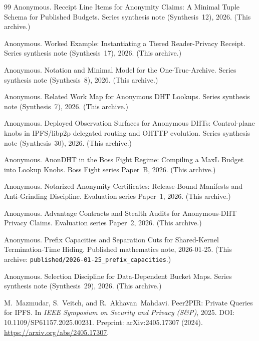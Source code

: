 \documentclass[11pt]{article}
\begin{document}
\begin{thebibliography}{99}
Anonymous.
\newblock Receipt Line Items for Anonymity Claims: A Minimal Tuple Schema for Published Budgets.
\newblock Series synthesis note (Synthesis~12), 2026. (This archive.)

Anonymous.
\newblock Worked Example: Instantiating a Tiered Reader-Privacy Receipt.
\newblock Series synthesis note (Synthesis~17), 2026. (This archive.)

Anonymous.
\newblock Notation and Minimal Model for the One-True-Archive.
\newblock Series synthesis note (Synthesis~8), 2026. (This archive.)

Anonymous.
\newblock Related Work Map for Anonymous {DHT} Lookups.
\newblock Series synthesis note (Synthesis~7), 2026. (This archive.)

Anonymous.
\newblock Deployed Observation Surfaces for Anonymous DHTs: Control-plane knobs in IPFS/libp2p delegated routing and OHTTP evolution.
\newblock Series synthesis note (Synthesis~30), 2026. (This archive.)


Anonymous.
\newblock AnonDHT in the Boss Fight Regime: Compiling a MaxL Budget into Lookup Knobs.
\newblock Boss Fight series Paper~B, 2026. (This archive.)

Anonymous.
\newblock Notarized Anonymity Certificates: Release-Bound Manifests and Anti-Grinding Discipline.
\newblock Evaluation series Paper~1, 2026. (This archive.)

Anonymous.
\newblock Advantage Contracts and Stealth Audits for Anonymous-DHT Privacy Claims.
\newblock Evaluation series Paper~2, 2026. (This archive.)


Anonymous.
\newblock Prefix Capacities and Separation Cuts for Shared-Kernel Termination-Time Hiding.
\newblock Published mathematics note, 2026-01-25. (This archive: \texttt{published/2026-01-25\_prefix\_capacities}.)

Anonymous.
\newblock Selection Discipline for Data-Dependent Bucket Maps.
\newblock Series synthesis note (Synthesis~29), 2026. (This archive.)

M.~Mazmudar, S.~Veitch, and R.~Akhavan~Mahdavi.
\newblock Peer2PIR: Private Queries for {IPFS}.
\newblock In \emph{IEEE Symposium on Security and Privacy (S\&P)}, 2025.
\newblock DOI: 10.1109/SP61157.2025.00231.
\newblock Preprint: arXiv:2405.17307 (2024).
\newblock \url{https://arxiv.org/abs/2405.17307}.


\end{thebibliography}
\end{document}
